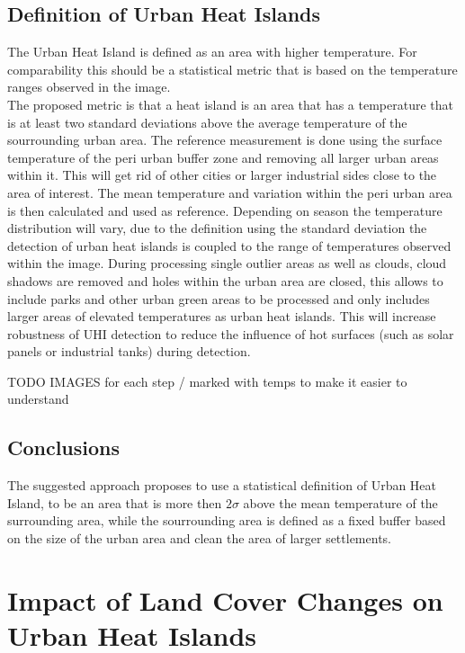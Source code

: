 \documentclass[12pt,a4paper, english]{article}
\begin{document}
    \subsection{Definition of Urban Heat Islands}\label{sec:definition}
    The Urban Heat Island is defined as an area with higher temperature.
    For comparability this should be a statistical metric that is based on the temperature ranges observed in the image.\\ 
    The proposed metric is that a heat island is an area that has a temperature that is at least two standard deviations above the average temperature of the sourrounding urban area. 
    The reference measurement is done using the surface temperature of the peri urban buffer zone and removing all larger urban areas within it. 
    This will get rid of other cities or larger industrial sides close to the area of interest.
    The mean temperature and variation within the peri urban area is then calculated and used as reference.
    Depending on season the temperature distribution will vary, due to the definition using the standard deviation the detection of urban heat islands is coupled to the range of temperatures observed within the image. 
    During processing single outlier areas as well as clouds, cloud shadows are removed and holes within the urban area are closed, this allows to include parks and other urban green areas to be processed and only includes larger areas of elevated temperatures as urban heat islands. 
    This will increase robustness of \gls{UHI} detection to reduce the influence of hot surfaces (such as solar panels or industrial tanks) during detection.
    
   TODO IMAGES for each step / marked with temps to make it easier to understand  

    \subsection{Conclusions}	
    The suggested approach proposes to use a statistical definition of Urban Heat Island, to be an area that is more then $2\sigma$ above the mean temperature of the surrounding area, while the sourrounding area is defined as a fixed buffer based on the size of the urban area and clean the area of larger settlements. 

%    
\newpage
\section{Impact of Land Cover Changes on Urban Heat Islands}\label{sec:LULC}
\end{document}
